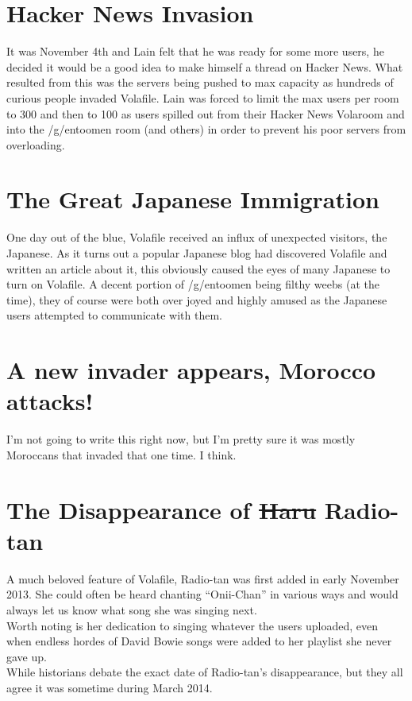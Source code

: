 \documentclass[12pt]{report}
\begin{document}
{\section{Hacker News Invasion}
It was November 4th and Lain felt that he was ready for some more users, he decided it would be a good idea to make himself a thread on Hacker News\footnotemark . 
What resulted from this was the servers being pushed to max capacity as hundreds of curious people invaded Volafile. Lain was forced to limit the max users per room to 300 and then to 100 as users spilled out from their Hacker News Volaroom and into the /g/entoomen room (and others) in order to prevent his poor servers from overloading.

\section{The Great Japanese Immigration}
	One day out of the blue, Volafile received an influx of unexpected visitors, the Japanese. As it turns out a popular Japanese blog had discovered Volafile and written an article about it, this obviously caused the eyes of many Japanese to turn on Volafile. A decent portion of /g/entoomen being filthy weebs (at the time), they of course were both over joyed and highly amused as the Japanese users attempted to communicate with them. %

\section{A new invader appears, Morocco attacks!}
I'm not going to write this right now, but I'm pretty sure it was mostly Moroccans that invaded that one time. I think.

\section[The Disappearance of  Radio-tan]{The Disappearance of \sout{Haru} Radio-tan\footnotemark} 
	A much beloved feature of Volafile, Radio-tan was first added in early November 2013. She could often be heard chanting ``Onii-Chan'' in various ways and would always let us know what song she was singing next.\\
	Worth noting is her dedication to singing whatever the users uploaded, even when endless hordes of David Bowie songs were added to her playlist she never gave up.\\
	While historians debate the exact date of Radio-tan's disappearance, but they all agree it was sometime during March 2014.

}
\end{document}
